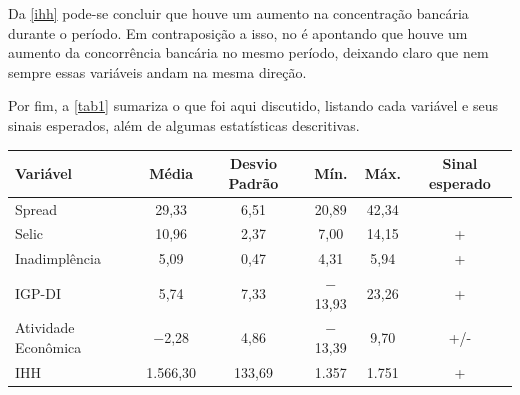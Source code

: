 \documentclass[a4paper,
               article,
               12pt,
               openany,
               oneside,
               english,
               brazil]{abntex2}
\numberwithin{equation}{section}
\begin{document}
    Da \autoref{ihh} pode-se concluir que houve um aumento na concentração bancária durante o período. Em contraposição a isso, no \textcite[11]{reb2017} é apontando que houve um aumento da concorrência bancária no mesmo período, deixando claro que nem sempre essas variáveis andam na mesma direção.

    Por fim, a \autoref{tab1} sumariza o que foi aqui discutido, listando cada variável e seus sinais esperados, além de algumas estatísticas descritivas.

    \begin{table}[h]
        {%
            \begin{tabular}
                {@{\extracolsep{5pt}}lccccc}
                \midrule
                Variável              & \multicolumn{1}{c}{Média} & \multicolumn{1}{c}{Desvio Padrão} & \multicolumn{1}{c}{Mín.} & \multicolumn{1}{c}{Máx.} & \multicolumn{1}{c}{Sinal esperado} \\
                \midrule
                Spread                & 29,33                     & 6,51                              & 20,89                    & 42,34                    &  \\
                Selic                 & 10,96                     & 2,37                              & 7,00                     & 14,15                    & + \\
                Inadimplência         & 5,09                      & 0,47                              & 4,31                     & 5,94                     & + \\
                IGP-DI                & 5,74                      & 7,33                              & $-$13,93                 & 23,26                    & + \\
                Atividade Econômica   & $-$2,28                   & 4,86                              & $-$13,39                 & 9,70                     & +/- \\
                IHH                   & 1.566,30                  & 133,69                            & 1.357                    & 1.751                    & + \\
                \midrule
            \end{tabular}
        }
        {}
    \end{table}
\end{document}
